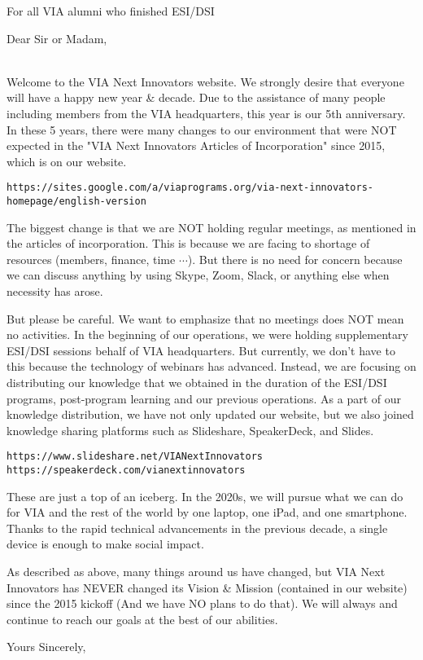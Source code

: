 \documentclass[11pt, a4paper]{letter} %
\begin{document}

\begin{letter}{
For all VIA alumni who finished ESI/DSI
}


\opening{Dear Sir or Madam,}\\
Welcome to the VIA Next Innovators website. We strongly desire that everyone will have a happy new year \& decade. Due to the assistance of many people including members from the VIA headquarters, this year is our 5th anniversary. In these 5 years, there were many changes to our environment that were NOT expected in the "VIA Next Innovators Articles of Incorporation" since 2015, which is on our website.
\begin{center}
\texttt{https://sites.google.com/a/viaprograms.org/via-next-innovators-homepage/english-version}
\end{center}
\par
The biggest change is that we are NOT holding regular meetings, as mentioned in the articles of incorporation. This is because we are facing to shortage of resources (members, finance, time $\cdots$). But there is no need for concern because we can discuss anything by using Skype, Zoom, Slack, or anything else when necessity has arose.
\par
But please be careful. We want to emphasize that no meetings does NOT mean no activities. In the beginning of our operations, we were holding supplementary ESI/DSI sessions behalf of VIA headquarters. But currently, we don't have to this because the technology of webinars has advanced. Instead, we are focusing on distributing our knowledge that we obtained in the duration of the ESI/DSI programs, post-program learning and our previous operations. As a part of our knowledge distribution, we have not only updated our website, but we also joined knowledge sharing platforms such as Slideshare, SpeakerDeck, and Slides.
\begin{center}
\texttt{https://www.slideshare.net/VIANextInnovators}\\
\texttt{https://speakerdeck.com/vianextinnovators}
\end{center}
These are just a top of an iceberg. In the 2020s, we will pursue what we can do for VIA and the rest of the world by one laptop, one iPad, and one smartphone. Thanks to the rapid technical advancements in the previous decade, a single device is enough to make social impact.
\par
As described as above, many things around us have changed, but VIA Next Innovators has NEVER changed its Vision \& Mission (contained in our website) since the 2015 kickoff (And we have NO plans to do that). We will always and continue to reach our goals at the best of our abilities.
\par
\closing{Yours Sincerely,}


\end{letter}
\end{document}
